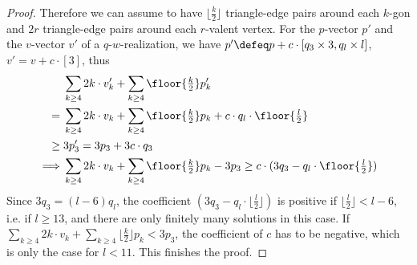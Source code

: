 \begin{theorem}
\begin{proof}
      





      
    
    Therefore we can assume to have $\lfloor \frac{k}{2} \rfloor$ triangle-edge pairs around each $k$-gon and $2r$ triangle-edge pairs around each $r$-valent vertex. For the $p$-vector $p'$ and the $v$-vector $v'$ of a $q$-$w$-realization, we have $p' \defeq p + c \cdot [q_3 \times 3, q_l \times l]$, $v' = v + c \cdot [3]$, thus
    \begin{align*}
      &\sum_{k \geq 4} 2k \cdot v'_k + \sum_{k \geq 4} \floor{\tfrac{k}{2}} p'_k \\
      ={}&\sum_{k \geq 4} 2k \cdot v_k + \sum_{k \geq 4} \floor{\tfrac{k}{2}} p_k + c \cdot q_l \cdot \floor{\tfrac{l}{2}}\\
      \geq{} & 3 p'_3 {}={} 3 p_3 + 3 c \cdot q_3 \\
      \implies & \sum_{k \geq 4} 2k \cdot v_k + \sum_{k \geq 4} \floor{\tfrac{k}{2}} p_k - 3p_3 \geq c \cdot (3 q_3 - q_l \cdot \floor{\tfrac{l}{2}})
    \end{align*}
    Since $3q_3 = (l - 6)q_l$, the coefficient $(3 q_3 - q_l \cdot \lfloor \tfrac{l}{2} \rfloor)$ is positive if $\lfloor \frac{l}{2} \rfloor  < l - 6$, i.e. if $l \geq 13$, and there are only finitely many solutions in this case. If $\sum_{k \geq 4} 2k \cdot v_k + \sum_{k \geq 4} \lfloor \tfrac{k}{2} \rfloor p_k < 3p_3$, the coefficient of $c$ has to be negative, which is only the case for $l < 11$. This finishes the proof.
  \end{proof}
\end{theorem}

